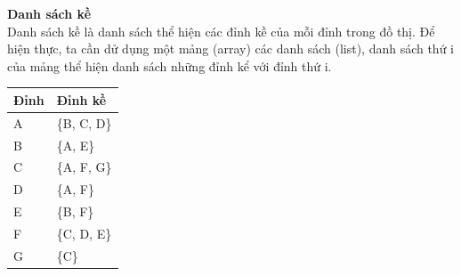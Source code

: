 \documentclass[a4paper]{article}
\begin{document}
\textbf{Danh sách kề}\\
Danh sách kề là danh sách thể hiện các đỉnh kề của mỗi đỉnh trong đồ thị. Để hiện thực, ta cần dử dụng một mảng (array) các danh sách (list), danh sách thứ i của mảng thể hiện danh sách những đỉnh kể với đỉnh thứ i.
\begin{table}[!h]
        \centering
        
\begin{tabular}
{|p{}|p{}|}
\hline 
 \textbf{Đỉnh} & \textbf{Đỉnh kề} \\
\hline 
 A & \{B, C, D\} \\
\hline 
 B & \{A, E\} \\
\hline 
 C & \{A, F, G\} \\
\hline 
 D & \{A, F\} \\
\hline 
 E & \{B, F\} \\
\hline 
 F & \{C, D, E\} \\
\hline 
 G & \{C\} \\
 \hline
\end{tabular}
        
        \end{table}
\end{document}

